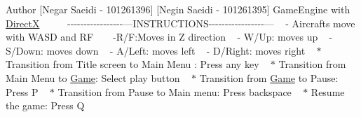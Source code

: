 \begin{DoxyAuthor}{Author}
\mbox{[}Negar Saeidi -\/ 101261396\mbox{]} \mbox{[}Negin Saeidi -\/ 101261395\mbox{]} Game\+Engine with \mbox{\hyperlink{namespace_direct_x}{DirectX}} ~\newline
~\newline
~\newline
 -\/-\/-\/-\/-\/-\/-\/-\/-\/-\/-\/-\/-\/-\/-\/-\/-\/---INSTRUCTIONS-\/-\/-\/-\/-\/-\/-\/-\/-\/-\/-\/-\/-\/-\/-\/-\/-\/--- ~\newline
 -\/ Aircrafts move with WASD and RF ~\newline
~\newline
 -\/R/F\+:Moves in Z direction ~\newline
 -\/ W/\+Up\+: moves up ~\newline
 -\/ S/\+Down\+: moves down ~\newline
 -\/ A/\+Left\+: moves left ~\newline
 -\/ D/\+Right\+: moves right ~\newline
 $\ast$ Transition from Title screen to Main Menu \+: Press any key ~\newline
 $\ast$ Transition from Main Menu to \mbox{\hyperlink{class_game}{Game}}\+: Select play button ~\newline
 $\ast$ Transition from \mbox{\hyperlink{class_game}{Game}} to Pause\+: Press P ~\newline
 $\ast$ Transition from Pause to Main menu\+: Press backspace ~\newline
 $\ast$ Resume the game\+: Press Q ~\newline
 
\end{DoxyAuthor}
